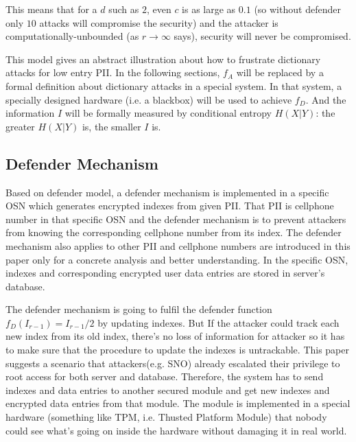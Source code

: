 \documentclass[10pt, conference, compsocconf]{IEEEtran}
\begin{document}
        This means that for a $d$ such as $2$, even $c$ is as large as
        $0.1$ (so without defender only $10$ attacks will compromise
        the security) and the attacker is computationally-unbounded
        (as $r \rightarrow \infty$ says), security will
        never be compromised.

        This model gives an abstract illustration about how to frustrate
        dictionary attacks for low entry PII.
        In the following sections, $f_A$ will be replaced by a formal definition
        about dictionary attacks in a special system.
        In that system, a specially designed hardware (i.e. a blackbox)
        will be used to achieve $f_D$.
        And the information $I$ will be formally
        measured by conditional entropy $H(X|Y)$: the greater $H(X|Y)$
        is, the smaller $I$ is.

    \subsection{Defender Mechanism}\label{sec_ds}
        Based on defender model, a defender mechanism is implemented
        in a specific OSN
        which generates encrypted indexes
        from given PII. That PII is cellphone number
        in that specific OSN and the defender mechanism is to prevent attackers
        from knowing the corresponding cellphone number from its index.
        The defender mechanism also applies to other PII and cellphone numbers are introduced
        in this paper only for a concrete analysis and better understanding.
        In the specific OSN, indexes and corresponding encrypted user data entries are stored
        in server's database.

        The defender mechanism is going to fulfil the defender
        function $f_D(I_{r-1}) = I_{r-1}/2$ by updating indexes.
        But If the attacker
        could track each new index from its old index, there's no loss of information
        for attacker so it has to make sure that the procedure to update the indexes
        is untrackable.
        This paper suggests a scenario that attackers(e.g. SNO) already
        escalated their privilege to root access for
        both server and database. Therefore, the system has to send
        indexes and data entries to another
        secured module and get new indexes and encrypted data
        entries from that module.
        The module is implemented in a special hardware (something
        like TPM, i.e. Thusted Platform Module) that nobody
        could see what's going on inside the hardware without damaging it in real world.
\end{document}
